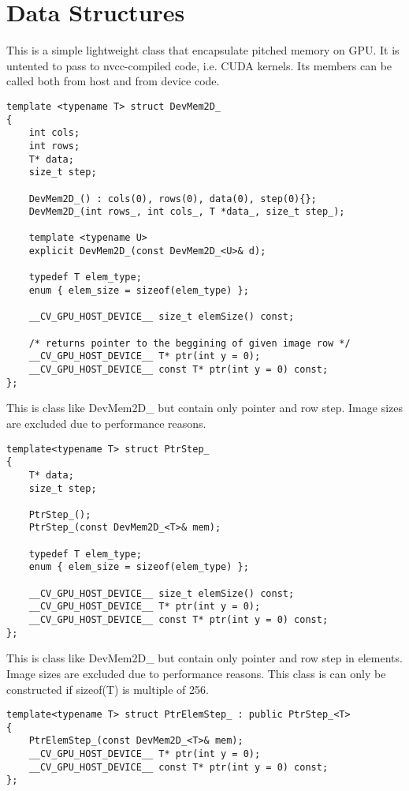 \section{Data Structures}


This is a simple lightweight class that encapsulate pitched memory on GPU. It is untented to pass to nvcc-compiled code, i.e. CUDA kernels. Its members can be called both from host and from device code.

\begin{lstlisting}
template <typename T> struct DevMem2D_
{            
    int cols;
    int rows;
    T* data;
    size_t step;
	
    DevMem2D_() : cols(0), rows(0), data(0), step(0){};	
    DevMem2D_(int rows_, int cols_, T *data_, size_t step_);
			
    template <typename U>            
    explicit DevMem2D_(const DevMem2D_<U>& d);
	
    typedef T elem_type;
    enum { elem_size = sizeof(elem_type) };

    __CV_GPU_HOST_DEVICE__ size_t elemSize() const;

    /* returns pointer to the beggining of given image row */
    __CV_GPU_HOST_DEVICE__ T* ptr(int y = 0);
    __CV_GPU_HOST_DEVICE__ const T* ptr(int y = 0) const;
};
\end{lstlisting}


This is class like DevMem2D\_ but contain only pointer and row step.  Image sizes are excluded due to performance reasons.

\begin{lstlisting}
template<typename T> struct PtrStep_
{
	T* data;
	size_t step;

	PtrStep_();
	PtrStep_(const DevMem2D_<T>& mem);

	typedef T elem_type;
	enum { elem_size = sizeof(elem_type) };

	__CV_GPU_HOST_DEVICE__ size_t elemSize() const;
	__CV_GPU_HOST_DEVICE__ T* ptr(int y = 0);
	__CV_GPU_HOST_DEVICE__ const T* ptr(int y = 0) const;
};

\end{lstlisting}

This is class like DevMem2D\_ but contain only pointer and row step in elements.  Image sizes are excluded due to performance reasons. This class is can only be constructed if sizeof(T) is multiple of 256.

\begin{lstlisting}
template<typename T> struct PtrElemStep_ : public PtrStep_<T>
{                   
	PtrElemStep_(const DevMem2D_<T>& mem);
	__CV_GPU_HOST_DEVICE__ T* ptr(int y = 0);
	__CV_GPU_HOST_DEVICE__ const T* ptr(int y = 0) const;
};
\end{lstlisting}


